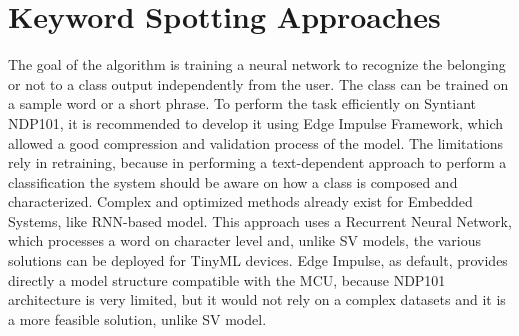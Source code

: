 \section{Keyword Spotting Approaches}
\label{subsec:kws approaches}
The goal of the algorithm is training a neural network to recognize the belonging or not to a class output independently from the user. The class can be trained on a sample word or a short phrase. To perform the task efficiently on Syntiant NDP101, it is recommended to develop it using Edge Impulse Framework, which allowed a good compression and validation process of the model. The limitations rely in retraining, because in performing a text-dependent approach to perform a classification the system should be aware on how a class is composed and characterized. Complex and optimized methods already exist for Embedded Systems, like RNN-based model. This approach uses a Recurrent Neural Network\cite{kws_rnn_based}, which processes a word on character level and, unlike SV models, the various solutions can be deployed for TinyML devices. Edge Impulse, as default, provides directly a model structure compatible with the MCU, because NDP101 architecture is very limited, but it would not rely on a complex datasets and it is a more feasible solution, unlike SV model.

\newpage